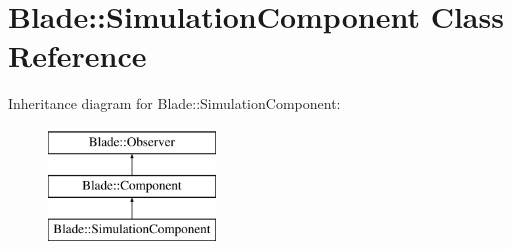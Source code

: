 \hypertarget{class_blade_1_1_simulation_component}{}\section{Blade\+:\+:Simulation\+Component Class Reference}
\label{class_blade_1_1_simulation_component}
Inheritance diagram for Blade\+:\+:Simulation\+Component\+:\begin{figure}[H]
\begin{center}
\leavevmode
\includegraphics[height=3.000000cm]{class_blade_1_1_simulation_component}
\end{center}
\end{figure}
